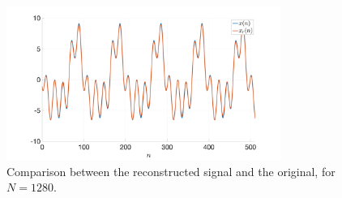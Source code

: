 \documentclass[]{scrartcl}
\begin{document}
\begin{figure}[htbp]
	\centering
	\includegraphics[width= 0.8\textwidth]{figures/R1f_1280.png}
	\caption{Comparison between the reconstructed signal and the original, for $N = 1280$.}
	\label{fig:R1f_1280}
\end{figure}
\end{document}
